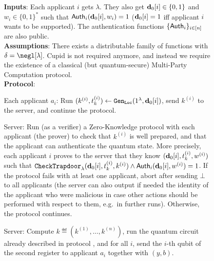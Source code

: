 \begin{figure}[htbp]
  \centering
  \begin{minipage}{1.0\linewidth}
    \begin{protocol}[H]
      \caption{\authBlindCanDist{}}\label{protocol:authBlindCanDist}
      \noindent\textbf{Inputs}: Each applicant $i$ gets $\lambda$. They also get $\mathbf{d}_0[i] \in \{0,1\}$ and $w_i \in \{0,1\}^*$ such that ${\sf Auth}_i(\mathbf{d}_0[i],w_i) = 1$ ($\mathbf{d}_0[i] = 1$ iff applicant $i$ wants to be supported). The authentication functions $\{{\sf Auth}_i\}_{i \in [n]}$ are also public.\\
      \textbf{Assumptions}: There exists a \AssumpFctCan{} distributable family of functions with $\delta = \negl[\lambda]$. Cupid is not required anymore, and instead we require the existence of a classical (but quantum-secure) Multi-Party Computation protocol.\\
      \textbf{Protocol}:%
      \begin{compressedList}
        \item Each applicant $a_i$: Run $ (k^{(i)},t_k^{(i)}) \leftarrow  {\tt Gen}_{\tt Loc}(1^\lambda,\mathbf{d}_0[i])$, send $k^{(i)}$ to the server, and continue the protocol.
        \item Server: Run (as a verifier) a Zero-Knowledge protocol with each applicant (the prover) to check that $k^{(i)}$ is well prepared, and that the applicant can authenticate the quantum state. More precisely, each applicant $i$ proves to the server that they know $(\mathbf{d}_0[i], t_k^{(i)},w^{(i)})$ such that ${\tt CheckTrapdoor}_\lambda(\mathbf{d}_0[i], t_k^{(i)}, k^{(i)}) \land {\sf Auth}_i(\mathbf{d}_0[i],w^{(i)}) = 1$. If the protocol fails with at least one applicant, abort after sending $\bot$ to all applicants (the server can also output if needed the identity of the applicant who were malicious in case other actions should be performed with respect to them, e.g.\ in further runs). Otherwise, the protocol continues.
        \item Server: Compute $k \eqdef (k^{(1)},\dots,k^{(n)})$, run the quantum circuit already described in protocol \blind{}, and for all $i$, send the $i$-th qubit of the second register to applicant $a_i$ together with $(y,b)$.

\end{compressedList}
\end{protocol}
\end{minipage}
\end{figure}
